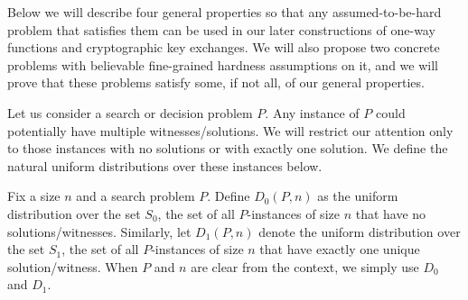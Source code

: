 
Below we will describe four general properties so that any assumed-to-be-hard problem that satisfies them can be used in our later constructions of one-way functions and cryptographic key exchanges. We will also propose two concrete problems with believable fine-grained hardness assumptions on it, and we will prove that these problems satisfy some, if not all, of our general properties.

%

Let us consider a search or decision problem $P$. Any instance of $P$ could potentially have multiple witnesses/solutions. We will restrict our attention only to those instances with no solutions or with exactly one solution. We define the natural uniform distributions over these instances below.


%

\begin{definition} Fix a size $n$ and a search problem $P$.
	Define $D_0(P,n)$ as the uniform distribution over the set $S_0$, the set of all $P$-instances of size $n$ that have no solutions/witnesses.
	Similarly, let $D_1(P,n)$ denote the uniform distribution over the set $S_1$, the set of all $P$-instances of size $n$ that have exactly one unique solution/witness. When $P$ and $n$ are clear from the context, we simply use $D_0$ and $D_1$.
\end{definition}

